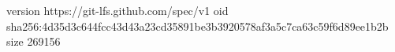 version https://git-lfs.github.com/spec/v1
oid sha256:4d35d3c644fcc43d43a23cd35891be3b3920578af3a5c7ca63c59f6d89ee1b2b
size 269156
